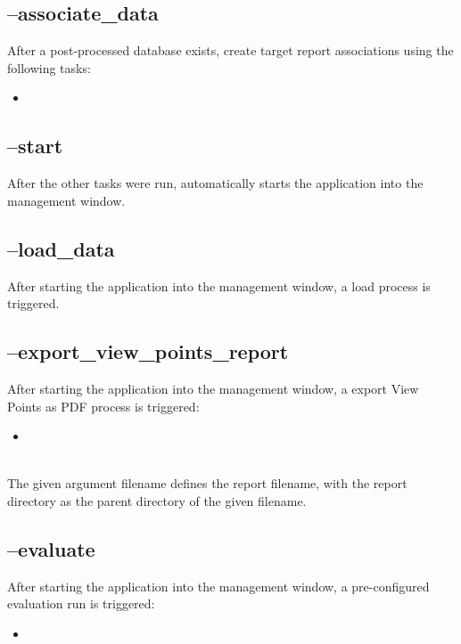 \subsection{--associate\_data}

After a post-processed database exists, create target report associations using the following tasks:

\begin{itemize}
 \item {}
\end{itemize}

\subsection{--start}

After the other tasks were run, automatically starts the application into the management window.

\subsection{--load\_data}

After starting the application into the management window, a load process is triggered.


\subsection{--export\_view\_points\_report}

After starting the application into the management window, a export View Points as PDF process is triggered:

\begin{itemize}
 \item {}
\end{itemize}
\ \\

The given argument filename defines the report filename, with the report directory as the parent directory of the given filename.

\subsection{--evaluate}

After starting the application into the management window, a pre-configured evaluation run is triggered:

\begin{itemize}
 \item {}
\end{itemize}
\ \\

